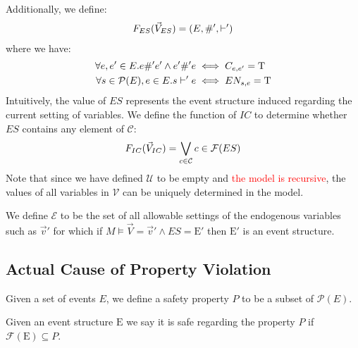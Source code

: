 Additionally, we define:
\begin{align*}
    F_{ES}(\vec V_{ES}) = (E,\#',\vdash')
\end{align*}
where we have:
\begin{align*}
    \forall e,e' \in E. e \#' e' \wedge e' \#' e
     & \iff C_{e,e'} = \mathrm{T} \\
    \forall s \in \mathcal{P}(E), e \in E.  s \vdash' e
     & \iff EN_{s,e} = \mathrm{T}
\end{align*}
Intuitively, the value of $ES$ represents the event structure induced
regarding the current setting of variables.
We define the function of $IC$ to determine whether $ES$
contains any element of $\mathcal{C}$:
\begin{align*}
    F_{IC}(\vec V_{IC}) = \bigvee_{c \in \mathcal{C}}c \in \mathcal{F}(ES)
\end{align*}
Note that since we have defined $\mathcal{U}$ to be empty and
\textcolor{red}{the model is recursive}, the values of all variables in
$\mathcal{V}$ can be uniquely determined in the model.

We define $\mathcal{E}$ to be the set of all allowable
settings of the endogenous variables such as $\vec v'$
for which if $M \vDash \vec V = \vec v' \wedge ES = \mathrm{E}'$
then $\mathrm{E}'$ is an event structure.

\subsection{Actual Cause of Property Violation}
\begin{definition}
    Given a set of events $E$, we define a safety property $P$ to be a
    subset of $\mathcal{P}(E)$.
\end{definition}
\begin{definition}
    Given an event structure $\mathrm{E}$ we say it is safe regarding the 
    property $P$ if $\mathcal{F}(\mathrm{E}) \subseteq P$.
\end{definition}

